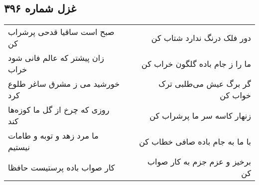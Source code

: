 \begin{center}
\section*{غزل شماره ۳۹۶}
\label{sec:sh396}
\begin{longtable}{l p{0.5cm} r}
صبح است ساقیا قدحی پرشراب کن
&&
دور فلک درنگ ندارد شتاب کن
\\
زان پیشتر که عالم فانی شود خراب
&&
ما را ز جام باده گلگون خراب کن
\\
خورشید می ز مشرق ساغر طلوع کرد
&&
گر برگ عیش می‌طلبی ترک خواب کن
\\
روزی که چرخ از گل ما کوزه‌ها کند
&&
زنهار کاسه سر ما پرشراب کن
\\
ما مرد زهد و توبه و طامات نیستیم
&&
با ما به جام باده صافی خطاب کن
\\
کار صواب باده پرستیست حافظا
&&
برخیز و عزم جزم به کار صواب کن
\\
\end{longtable}
\end{center}
